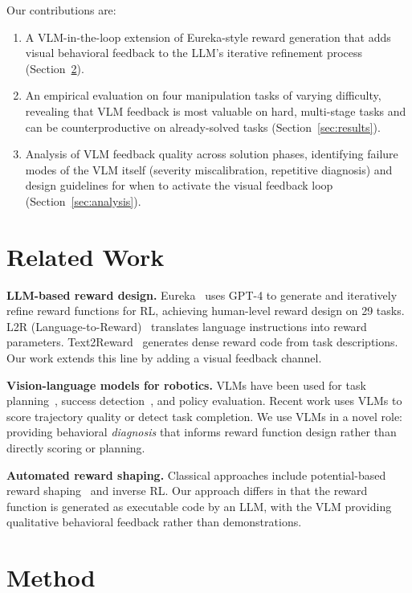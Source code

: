 \documentclass[conference]{IEEEtran}
\begin{document}
Our contributions are:
\begin{enumerate}
  \item A VLM-in-the-loop extension of Eureka-style reward generation that adds
    visual behavioral feedback to the LLM's iterative refinement process
    (Section~\ref{sec:method}).
  \item An empirical evaluation on four manipulation tasks of varying difficulty,
    revealing that VLM feedback is most valuable on hard, multi-stage tasks
    and can be counterproductive on already-solved tasks
    (Section~\ref{sec:results}).
  \item Analysis of VLM feedback quality across solution phases,
    identifying failure modes of the VLM itself (severity miscalibration,
    repetitive diagnosis) and design guidelines for when to activate the visual
    feedback loop (Section~\ref{sec:analysis}).
\end{enumerate}


\section{Related Work}

\textbf{LLM-based reward design.}
Eureka~\cite{eureka} uses GPT-4 to generate and iteratively refine reward
functions for RL, achieving human-level reward design on 29 tasks. L2R
(Language-to-Reward)~\cite{l2r} translates language instructions into reward
parameters. Text2Reward~\cite{text2reward} generates dense reward code from task
descriptions. Our work extends this line by adding a visual feedback channel.

\textbf{Vision-language models for robotics.}
VLMs have been used for task planning~\cite{saycan}, success
detection~\cite{vlm_success}, and policy evaluation. Recent work uses VLMs to
score trajectory quality or detect task completion. We use VLMs in a novel role:
providing behavioral \emph{diagnosis} that informs reward function design rather
than directly scoring or planning.

\textbf{Automated reward shaping.}
Classical approaches include potential-based reward shaping~\cite{pbrs} and
inverse RL. Our approach differs in that the reward function is generated as
executable code by an LLM, with the VLM providing qualitative behavioral
feedback rather than demonstrations.


\section{Method}\label{sec:method}
\end{document}
